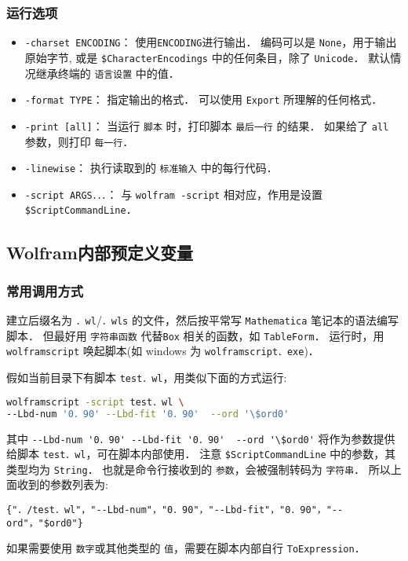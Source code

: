 \subsubsection{运行选项}
\begin{itemize}
\item \verb`-charset ENCODING`： 使用\verb`ENCODING`进行输出． 编码可以是 \verb`None`，用于输出原始字节,
或是 \verb`$CharacterEncodings` 中的任何条目，除了 \verb`Unicode`． 默认情况继承终端的 \verb`语言设置` 中的值．
\item \verb`-format TYPE`： 指定输出的格式． 可以使用 \verb`Export` 所理解的任何格式．
\item \verb`-print [all]`： 当运行 \verb`脚本` 时，打印脚本 \verb`最后一行` 的结果． 如果给了 \verb`all` 参数，则打印 \verb`每一行`．
\item \verb`-linewise`： 执行读取到的 \verb`标准输入` 中的每行代码．
\item \verb`-script ARGS．．．`： 与 \verb`wolfram -script` 相对应，作用是设置 \verb`$ScriptCommandLine`．
\end{itemize}

\subsection{Wolfram内部预定义变量}

\subsubsection{常用调用方式}

建立后缀名为 \verb`．wl`/\verb`．wls` 的文件，然后按平常写 \verb`Mathematica` 笔记本的语法编写脚本．
但最好用 \verb`字符串函数` 代替\verb`Box` 相关的函数，如 \verb`TableForm`．
运行时，用 \verb`wolframscript` 唤起脚本(如 windows 为 \verb`wolframscript．exe`)．

假如当前目录下有脚本 \verb`test．wl`，用类似下面的方式运行:
\begin{lstlisting}[language=bash]
wolframscript -script test．wl \
--Lbd-num '0．90' --Lbd-fit '0．90'  --ord '\$ord0'
\end{lstlisting}

其中 \verb`--Lbd-num '0．90' --Lbd-fit '0．90'  --ord '\$ord0'` 将作为参数提供给脚本 \verb`test．wl`，可在脚本内部使用．
注意 \verb`$ScriptCommandLine` 中的参数，其类型均为 \verb`String`．
也就是命令行接收到的 \verb`参数`，会被强制转码为 \verb`字符串`．
所以上面收到的参数列表为:
\begin{lstlisting}[language=wolfram]
{"．/test．wl"，"--Lbd-num"，"0．90"，"--Lbd-fit"，"0．90"，"--ord"，"$ord0"}
\end{lstlisting}
如果需要使用 \verb`数字`或其他类型的 \verb`值`，需要在脚本内部自行 \verb`ToExpression`．

